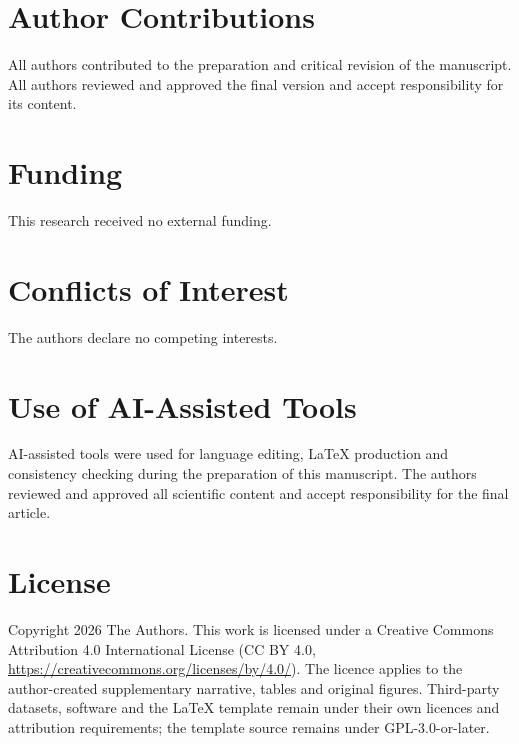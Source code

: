 \documentclass[times,twoside]{_Templates/MultiTargetManuscript}
\begin{document}
\section*{Author Contributions}

All authors contributed to the preparation and critical revision of the
manuscript. All authors reviewed and approved the final version and accept
responsibility for its content.

\section*{Funding}

This research received no external funding.

\section*{Conflicts of Interest}

The authors declare no competing interests.

\section*{Use of AI-Assisted Tools}

AI-assisted tools were used for language editing, LaTeX production and
consistency checking during the preparation of this manuscript. The authors
reviewed and approved all scientific content and accept responsibility for the
final article.

\section*{License}

Copyright \textcopyright{} 2026 The Authors. This work is licensed under a
Creative Commons Attribution 4.0 International License (CC BY 4.0,
\url{https://creativecommons.org/licenses/by/4.0/}). The licence applies to the
author-created supplementary narrative, tables and original figures.
Third-party datasets, software and the LaTeX template remain under their own
licences and attribution requirements; the template source remains under
GPL-3.0-or-later.
\end{document}
